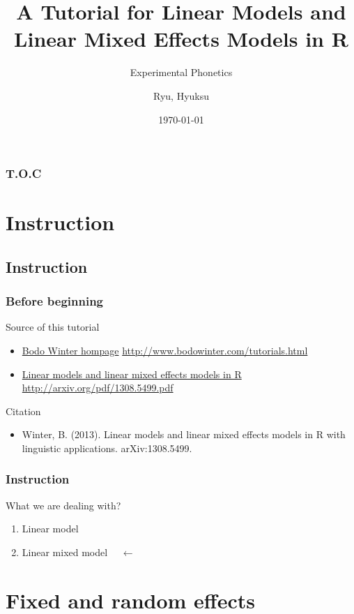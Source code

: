 \documentclass[10p]{beamer}\usepackage[]{graphicx}\usepackage[]{color}
\author{Ryu, Hyuksu}
\institute{Naver Clova}
\title{A Tutorial for Linear Models and Linear Mixed Effects Models in R}
\subtitle{Experimental Phonetics}
\date{\today}
\begin{document}
\begin{frame}
\maketitle
\end{frame}

\begin{frame}
\frametitle{T.O.C}
	\tableofcontents[subsectionstyle=hide]
\end{frame}

\section{Instruction}
\subsection{Instruction}

\begin{frame}
\frametitle{Before beginning}
Source of this tutorial
\begin{itemize}
  \item \href{http://www.bodowinter.com/tutorials.html}{Bodo Winter hompage} 
  \url{http://www.bodowinter.com/tutorials.html}
  \item \href{http://arxiv.org/pdf/1308.5499.pdf}{Linear models and linear mixed effects models in R}
  \url{http://arxiv.org/pdf/1308.5499.pdf}
\end{itemize}
\vspace{9pt}
Citation
\begin{itemize}
  \item Winter, B. (2013). Linear models and linear mixed effects models in R with linguistic applications. arXiv:1308.5499. 
\end{itemize}
\end{frame}

\begin{frame}
\frametitle{Instruction}
What we are dealing with?
\begin{enumerate}
\item Linear model
\item \alert{Linear mixed model} $\quad \leftarrow$
\end{enumerate}
\end{frame}

\section[Effects]{Fixed and random effects}
\end{document}
